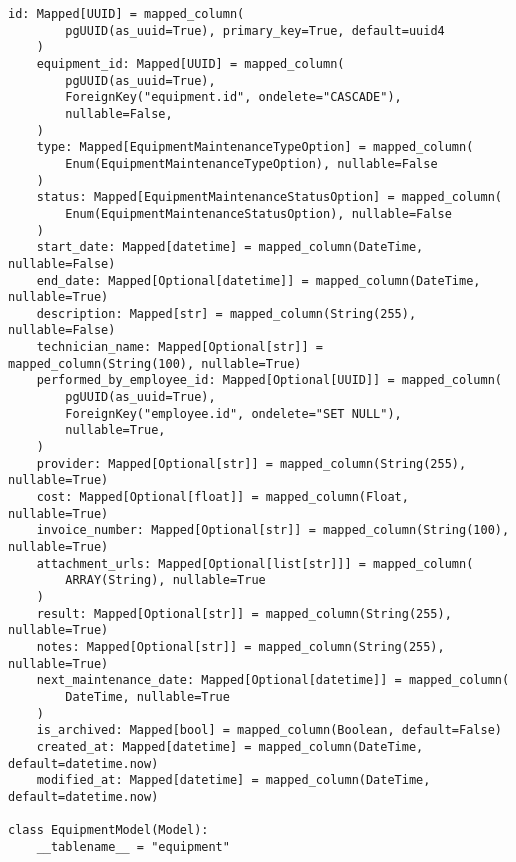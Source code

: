 \begin{lstlisting}[style=pythonstyle]
    id: Mapped[UUID] = mapped_column(
        pgUUID(as_uuid=True), primary_key=True, default=uuid4
    )
    equipment_id: Mapped[UUID] = mapped_column(
        pgUUID(as_uuid=True),
        ForeignKey("equipment.id", ondelete="CASCADE"),
        nullable=False,
    )
    type: Mapped[EquipmentMaintenanceTypeOption] = mapped_column(
        Enum(EquipmentMaintenanceTypeOption), nullable=False
    )
    status: Mapped[EquipmentMaintenanceStatusOption] = mapped_column(
        Enum(EquipmentMaintenanceStatusOption), nullable=False
    )
    start_date: Mapped[datetime] = mapped_column(DateTime, nullable=False)
    end_date: Mapped[Optional[datetime]] = mapped_column(DateTime, nullable=True)
    description: Mapped[str] = mapped_column(String(255), nullable=False)
    technician_name: Mapped[Optional[str]] = mapped_column(String(100), nullable=True)
    performed_by_employee_id: Mapped[Optional[UUID]] = mapped_column(
        pgUUID(as_uuid=True),
        ForeignKey("employee.id", ondelete="SET NULL"),
        nullable=True,
    )
    provider: Mapped[Optional[str]] = mapped_column(String(255), nullable=True)
    cost: Mapped[Optional[float]] = mapped_column(Float, nullable=True)
    invoice_number: Mapped[Optional[str]] = mapped_column(String(100), nullable=True)
    attachment_urls: Mapped[Optional[list[str]]] = mapped_column(
        ARRAY(String), nullable=True
    )
    result: Mapped[Optional[str]] = mapped_column(String(255), nullable=True)
    notes: Mapped[Optional[str]] = mapped_column(String(255), nullable=True)
    next_maintenance_date: Mapped[Optional[datetime]] = mapped_column(
        DateTime, nullable=True
    )
    is_archived: Mapped[bool] = mapped_column(Boolean, default=False)
    created_at: Mapped[datetime] = mapped_column(DateTime, default=datetime.now)
    modified_at: Mapped[datetime] = mapped_column(DateTime, default=datetime.now)

class EquipmentModel(Model):
    __tablename__ = "equipment"


\end{lstlisting}
